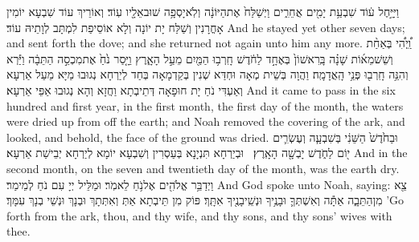 {וַיִּיָּ֣חֶל ע֔וֹד שִׁבְעַ֥ת יָמִ֖ים אֲחֵרִ֑ים וַיְשַׁלַּח֙ אֶת\maqqaf הַיּוֹנָ֔ה וְלֹֽא\maqqaf יָסְפָ֥ה שׁוּב\maqqaf אֵלָ֖יו עֽוֹד׃}
{וְאוֹרֵיךְ עוֹד שִׁבְעָא יוֹמִין אָחֳרָנִין וְשַׁלַּח יָת יוֹנָה וְלָא אוֹסֵיפַת לִמְתָּב לְוָתֵיהּ עוֹד׃}
{And he stayed yet other seven days; and sent forth the dove; and she returned not again unto him any more.}{}
{וַֽ֠יְהִ֠י בְּאַחַ֨ת וְשֵׁשׁ\maqqaf מֵא֜וֹת שָׁנָ֗ה בָּֽרִאשׁוֹן֙ בְּאֶחָ֣ד לַחֹ֔דֶשׁ חָֽרְב֥וּ הַמַּ֖יִם מֵעַ֣ל הָאָ֑רֶץ וַיָּ֤סַר נֹ֙חַ֙ אֶת\maqqaf מִכְסֵ֣ה הַתֵּבָ֔ה וַיַּ֕רְא וְהִנֵּ֥ה חָֽרְב֖וּ פְּנֵ֥י הָֽאֲדָמָֽה׃}
{וַהֲוָה בְּשֵׁית מְאָה וּחְדַּא שְׁנִין בְּקַדְמָאָה בְּחַד לְיַרְחָא נְגוּבוּ מַיָּא מֵעַל אַרְעָא וְאַעְדִּי נֹחַ יָת חוּפָאָה דְּתֵיבְתָא וַחֲזָא וְהָא נְגוּבוּ אַפֵּי אַרְעָא׃}
{And it came to pass in the six hundred and first year, in the first month, the first day of the month, the waters were dried up from off the earth; and Noah removed the covering of the ark, and looked, and behold, the face of the ground was dried.}{}
{וּבַחֹ֙דֶשׁ֙ הַשֵּׁנִ֔י בְּשִׁבְעָ֧ה וְעֶשְׂרִ֛ים י֖וֹם לַחֹ֑דֶשׁ יָבְשָׁ֖ה הָאָֽרֶץ׃ \setuma }
{וּבְיַרְחָא תִּנְיָנָא בְּעַסְרִין וְשִׁבְעָא יוֹמָא לְיַרְחָא יְבֵישַׁת אַרְעָא׃}
{And in the second month, on the seven and twentieth day of the month, was the earth dry.}{}
\newseder
{}%
{וַיְדַבֵּ֥ר אֱלֹהִ֖ים אֶל\maqqaf נֹ֥חַ לֵאמֹֽר׃}
{וּמַלֵּיל יְיָ עִם נֹחַ לְמֵימַר׃}
{And God spoke unto Noah, saying:}{}
{צֵ֖א מִן\maqqaf הַתֵּבָ֑ה אַתָּ֕ה וְאִשְׁתְּךָ֛ וּבָנֶ֥יךָ וּנְשֵֽׁי\maqqaf בָנֶ֖יךָ אִתָּֽךְ׃}
{פּוֹק מִן תֵּיבְתָא אַתְּ וְאִתְּתָךְ וּבְנָךְ וּנְשֵׁי בְנָךְ עִמָּךְ׃}
{’Go forth from the ark, thou, and thy wife, and thy sons, and thy sons’  wives with thee.}{}
